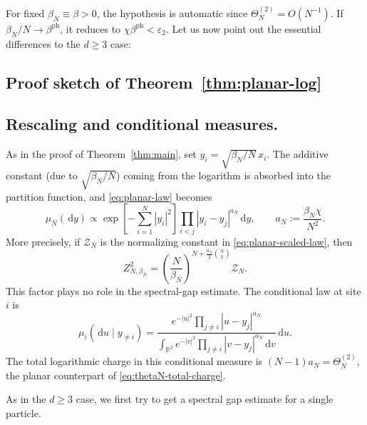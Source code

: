 \documentclass[12pt,reqno,letterpaper]{amsart}
\theoremstyle{definition}
\theoremstyle{remark}
\numberwithin{equation}{section}
\newcommand{\R}{\mathbb R}
\newcommand{\dd}{\,\mathrm d}
\newcommand{\be}{\beta}
\begin{document}
\begin{appendix}
For fixed \(\be_N\equiv\be>0\), the hypothesis is automatic since
\(\Theta_N^{(2)}=O(N^{-1})\).  If
\(\be_N/N\to\beta^{\mathrm{ph}}\), it reduces to
\(\chi\beta^{\mathrm{ph}}<\varepsilon_2\).
Let us now point out the essential differences to the $d\ge 3 $ case:
\subsection*{Proof sketch of Theorem~\ref{thm:planar-log}}

\subsection{Rescaling and conditional measures.}
As in the proof of Theorem~\ref{thm:main}, set
\(y_i=\sqrt{\be_N/N}\,x_i\).  The additive constant (due to $\sqrt{\be_N/N}$) coming from the logarithm
is absorbed into the partition function, and
\eqref{eq:planar-law} becomes
\begin{equation}\label{eq:planar-scaled-law}
 \mu_N(\dd y)
 \propto
 \exp\!\left[-\sum_{i=1}^N|y_i|^2\right]
 \prod_{i<j}|y_i-y_j|^{a_N}\dd y,
 \qquad a_N:=\frac{\be_N\chi}{N^2}.
\end{equation}
More precisely, if \(\mathcal Z_N\) is the normalizing constant in
\eqref{eq:planar-scaled-law}, then
\[
 Z_{N,\be_N}^{2}
 =\left(\frac{N}{\be_N}\right)^{
   N+\frac{a_N}{2}\binom N2}\mathcal Z_N.
\]
This factor plays no role in the spectral-gap estimate.  The conditional law
at site \(i\) is
\begin{equation}\label{eq:planar-conditional}
 \mu_i(\dd u\mid y_{\ne i})
 =\frac{e^{-|u|^2}\prod_{j\ne i}|u-y_j|^{a_N}}
 {\displaystyle\int_{\R^2}e^{-|v|^2}
   \prod_{j\ne i}|v-y_j|^{a_N}\dd v}\dd u.
\end{equation}
The total logarithmic charge in this conditional measure is
\((N-1)a_N=\Theta_N^{(2)}\), the planar counterpart of
\eqref{eq:thetaN-total-charge}.

As in the $d\ge 3$ case, we first try to get a spectral gap estimate for a single particle. 


\end{appendix}
\end{document}
